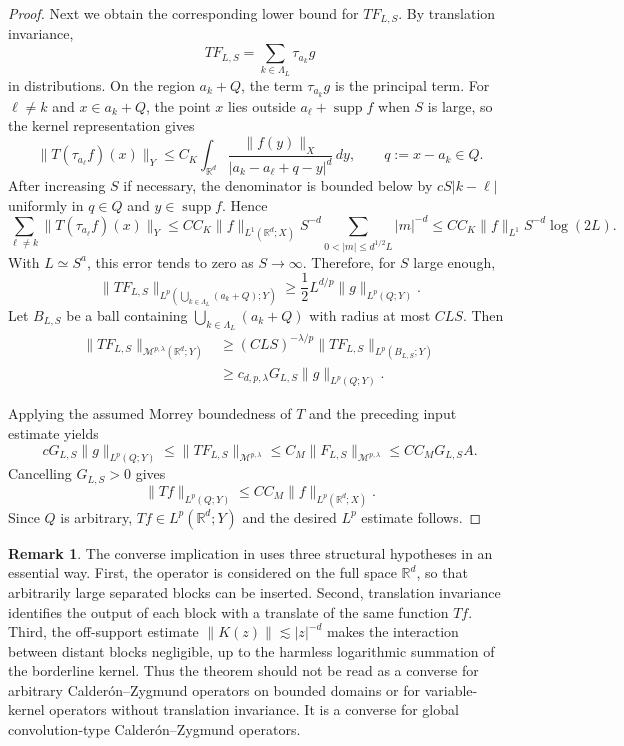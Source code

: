 \documentclass[11pt]{article}
\theoremstyle{definition}
\newtheorem{remark}[theorem]{Remark}
\newcommand{\R}{\mathbb R}
\begin{document}
\begin{proof}
		Next we obtain the corresponding lower bound for $TF_{L,S}$.  By translation invariance,
		\[
		TF_{L,S}=\sum_{k\in\Lambda_L}\tau_{a_k}g
		\]
		in distributions.  On the region $a_k+Q$, the term $\tau_{a_k}g$ is the principal term.  For $\ell\ne k$ and $x\in a_k+Q$, the point $x$ lies outside $a_\ell+\operatorname{supp}f$ when $S$ is large, so the kernel representation gives
		\[
		\|T(\tau_{a_\ell}f)(x)\|_Y
		\le
		C_K\int_{\R^d}\frac{\|f(y)\|_X}{|a_k-a_\ell+q-y|^d}\,dy,
		\qquad q:=x-a_k\in Q.
		\]
		After increasing $S$ if necessary, the denominator is bounded below by $cS|k-\ell|$ uniformly in $q\in Q$ and $y\in\operatorname{supp}f$.  Hence
		\[
		\sum_{\ell\ne k}\|T(\tau_{a_\ell}f)(x)\|_Y
		\le
		C C_K\|f\|_{L^1(\R^d;X)}S^{-d}
		\sum_{0<|m|\le d^{1/2}L}|m|^{-d}
		\le
		C C_K\|f\|_{L^1}S^{-d}\log(2L).
		\]
		With $L\simeq S^a$, this error tends to zero as $S\to\infty$.  Therefore, for $S$ large enough,
		\[
		\|TF_{L,S}\|_{L^p(\bigcup_{k\in\Lambda_L}(a_k+Q);Y)}
		\ge
		\frac12 L^{d/p}\|g\|_{L^p(Q;Y)}.
		\]
		Let $B_{L,S}$ be a ball containing $\bigcup_{k\in\Lambda_L}(a_k+Q)$ with radius at most $C LS$.  Then
		\[
		\begin{aligned}
		\|TF_{L,S}\|_{\mathcal M^{p,\lambda}(\R^d;Y)}
		&\ge
		(CLS)^{-\lambda/p}
		\|TF_{L,S}\|_{L^p(B_{L,S};Y)} \\
		&\ge
		c_{d,p,\lambda}G_{L,S}\|g\|_{L^p(Q;Y)}.
		\end{aligned}
		\]

		Applying the assumed Morrey boundedness of $T$ and the preceding input estimate yields
		\[
		cG_{L,S}\|g\|_{L^p(Q;Y)}
		\le
		\|TF_{L,S}\|_{\mathcal M^{p,\lambda}}
		\le
		C_M\|F_{L,S}\|_{\mathcal M^{p,\lambda}}
		\le
		C C_M G_{L,S}A.
		\]
		Cancelling $G_{L,S}>0$ gives
		\[
		\|Tf\|_{L^p(Q;Y)}\le C C_M\|f\|_{L^p(\R^d;X)}.
		\]
		Since $Q$ is arbitrary, $Tf\in L^p(\R^d;Y)$ and the desired $L^p$ estimate follows.
	\end{proof}

	\begin{remark}\label{rem:scope-reverse-morrey-lp}
		The converse implication in  uses three structural hypotheses in an essential way.  First, the operator is considered on the full space $\R^d$, so that arbitrarily large separated blocks can be inserted.  Second, translation invariance identifies the output of each block with a translate of the same function $Tf$.  Third, the off-support estimate $\|K(z)\|\lesssim |z|^{-d}$ makes the interaction between distant blocks negligible, up to the harmless logarithmic summation of the borderline kernel.  Thus the theorem should not be read as a converse for arbitrary Calder\'on--Zygmund operators on bounded domains or for variable-kernel operators without translation invariance.  It is a converse for global convolution-type Calder\'on--Zygmund operators.
	\end{remark}
\end{document}
